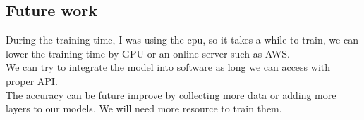\documentclass{article}
\begin{document}
\subsection{Future work}
During the training time, I was using the cpu, so it takes a while to train, we can lower the training time by GPU or an online server such as AWS.\\
We can try to integrate the model into software as long we can access  with proper API.\\
The accuracy can be future improve by collecting more data or adding more layers to our models. We will need more resource to train them.



\end{document}
